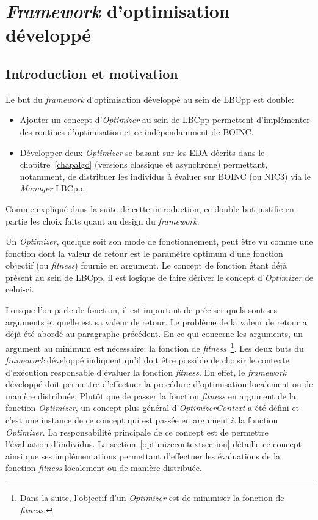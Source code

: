 \documentclass[a4paper, 12pt]{report}
\begin{document}
\section{\textit{Framework} d'optimisation développé}
\label{frameworkintro}

\subsection{Introduction et motivation}
Le but du \textit{framework} d'optimisation développé au sein de LBCpp est double:
\begin{itemize}
\item Ajouter un concept d'\textit{Optimizer} au sein de LBCpp permettent d'implémenter des routines d'optimisation et ce indépendamment de \textsc{BOINC}.
\item Développer deux \textit{Optimizer} se basant sur les EDA décrits dans le chapitre~\ref{chapalgo} (versions classique et asynchrone) permettant, notamment, de distribuer les individus à évaluer sur \textsc{BOINC} (ou NIC3) via le \textit{Manager} LBCpp.
\end{itemize}
Comme expliqué dans la suite de cette introduction, ce double but justifie en partie les choix faits quant au design du \textit{framework}.

Un \textit{Optimizer}, quelque soit son mode de fonctionnement, peut être vu comme une fonction dont la valeur de retour est le paramètre optimum d'une fonction objectif (ou \textit{fitness}) fournie en argument. Le concept de fonction étant déjà présent au sein de LBCpp, il est logique de faire dériver le concept d'\textit{Optimizer} de celui-ci.

Lorsque l'on parle de fonction, il est important de préciser quels sont ses arguments et quelle est sa valeur de retour. Le problème de la valeur de retour a déjà été abordé au paragraphe précédent. En ce qui concerne les arguments, un argument au minimum est nécessaire: la fonction de \textit{fitness}~\footnote{Dans la suite, l'objectif d'un \textit{Optimizer} est de minimiser la fonction de \textit{fitness}.}. Les deux buts du \textit{framework} développé indiquent qu'il doit être possible de choisir le contexte d'exécution responsable d'évaluer la fonction \textit{fitness}. En effet, le \textit{framework} développé doit permettre d'effectuer la procédure d'optimisation localement ou de manière distribuée. Plutôt que de passer la fonction \textit{fitness} en argument de la fonction \textit{Optimizer}, un concept plus général d'\textit{OptimizerContext} a été défini et c'est une instance de ce concept qui est passée en argument à la fonction \textit{Optimizer}. La responsabilité principale de ce concept est de permettre l'évaluation d'individus. La section~\ref{optimizecontextsection} détaille ce concept ainsi que ses implémentations permettant d'effectuer les évaluations de la fonction \textit{fitness} localement ou de manière distribuée.
\end{document}
